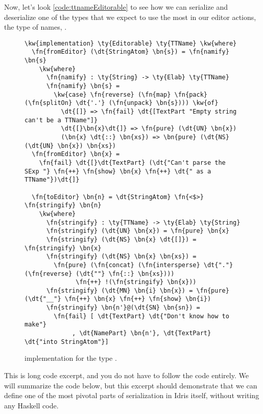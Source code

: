 Now, let's look \autoref{code:ttnameEditorable} to see how we can serialize and
deserialize one of the types that we expect to use the most in our editor
actions, the type of names, .

\begin{figure}[ht]
\caption{ implementation for the type .}
\label{code:ttnameEditorable}
\begin{Verbatim}[framesep=2mm, label=\footnotesize{\normalfont{Idris}}, labelposition=topline]
\kw{implementation} \ty{Editorable} \ty{TTName} \kw{where}
  \fn{fromEditor} (\dt{StringAtom} \bn{s}) = \fn{namify} \bn{s}
    \kw{where}
      \fn{namify} : \ty{String} -> \ty{Elab} \ty{TTName}
      \fn{namify} \bn{s} =
        \kw{case} \fn{reverse} (\fn{map} \fn{pack} (\fn{splitOn} \dt{'.'} (\fn{unpack} \bn{s}))) \kw{of}
          \dt{[]} => \fn{fail} \dt{[TextPart "Empty string can't be a TTName"]}
          \dt{[}\bn{x}\dt{]} => \fn{pure} (\dt{UN} \bn{x})
          (\bn{x} \dt{::} \bn{xs}) => \bn{pure} (\dt{NS} (\dt{UN} \bn{x}) \bn{xs})
  \fn{fromEditor} \bn{x} =
    \fn{fail} \dt{[}\dt{TextPart} (\dt{"Can't parse the SExp "} \fn{++} \fn{show} \bn{x} \fn{++} \dt{" as a TTName"})\dt{]}

  \fn{toEditor} \bn{n} = \dt{StringAtom} \fn{<$>} \fn{stringify} \bn{n}
    \kw{where}
      \fn{stringify} : \ty{TTName} -> \ty{Elab} \ty{String}
      \fn{stringify} (\dt{UN} \bn{x}) = \fn{pure} \bn{x}
      \fn{stringify} (\dt{NS} \bn{x} \dt{[]}) = \fn{stringify} \bn{x}
      \fn{stringify} (\dt{NS} \bn{x} \bn{xs}) =
        \fn{pure} (\fn{concat} (\fn{intersperse} \dt{"."} (\fn{reverse} (\dt{""} \fn{::} \bn{xs})))
              \fn{++} !(\fn{stringify} \bn{x}))
      \fn{stringify} (\dt{MN} \bn{i} \bn{x}) = \fn{pure} (\dt{"__"} \fn{++} \bn{x} \fn{++} \fn{show} \bn{i})
      \fn{stringify} \bn{n'}@(\dt{SN} \bn{sn}) =
        \fn{fail} [ \dt{TextPart} \dt{"Don't know how to make"}
             , \dt{NamePart} \bn{n'}, \dt{TextPart} \dt{"into StringAtom"}]
\end{Verbatim}
\end{figure}

This is long code excerpt, and you do not have to follow the code entirely.
We will summarize the code below, but this excerpt should demonstrate that
we can define one of the most pivotal parts of serialization in Idris itself,
without writing any Haskell code.

